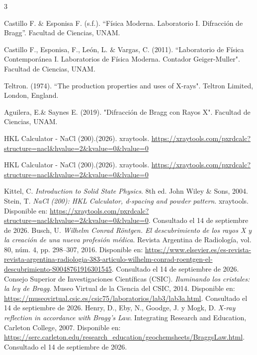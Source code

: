 \begin{thebibliography}{3}
	
	
	
	Castillo F. $\&$ Esponisa F. (s.f.). “Física Moderna. Laboratorio I. Difracción de Bragg”. Facultad de Ciencias, UNAM.
	
	Castillo F., Esponisa, F., León, L. $\&$ Vargas, C. (2011). “Laboratorio de Física Contemporánea I. Laboratorios de Física Moderna. Contador Geiger-Muller". Facultad de Ciencias, UNAM.
	
	Teltron. (1974). “The production properties and uses of X-rays". Teltron Limited, London, England.
	
	Aguilera, E.$\&$ Saynes E. (2019). "Difracción de Bragg con Rayos X". Facultad de Ciencias, UNAM.
	
	HKL Calculator - NaCl (200).(2026). xraytools. \url{https://xraytools.com/pxrdcalc?structure=nacl&hvalue=2&kvalue=0&lvalue=0}
	
	HKL Calculator - NaCl (200).(2026). xraytools. \url{https://xraytools.com/pxrdcalc?structure=nacl&hvalue=2&kvalue=0&lvalue=0}
	
	Kittel, C. \textit{Introduction to Solid State Physics}. 8th ed.
	John Wiley \& Sons, 2004.
	Stein, T. \textit{NaCl (200): HKL Calculator, d-spacing and powder pattern}.
	xraytools. Disponible en:
	\url{https://xraytools.com/pxrdcalc?structure=nacl\&hvalue=2\&kvalue=0\&lvalue=0}.
	Consultado el 14 de septiembre de 2026.
	Busch, U. \textit{Wilhelm Conrad Röntgen. El descubrimiento de los rayos X y
		la creación de una nueva profesión médica}. Revista Argentina de Radiología,
	vol. 80, núm. 4, pp. 298--307, 2016. Disponible en:
	\url{https://www.elsevier.es/es-revista-revista-argentina-radiologia-383-articulo-wilhelm-conrad-roentgen-el-descubrimiento-S0048761916301545}.
	Consultado el 14 de septiembre de 2026.
	Consejo Superior de Investigaciones Científicas (CSIC).
	\textit{Iluminando los cristales: la ley de Bragg}. Museo Virtual de la
	Ciencia del CSIC, 2014. Disponible en:
	\url{https://museovirtual.csic.es/csic75/laboratorios/lab3/lab3a.html}.
	Consultado el 14 de septiembre de 2026.
	Henry, D., Eby, N., Goodge, J. y Mogk, D.
	\textit{X-ray reflection in accordance with Bragg's Law}.
	Integrating Research and Education, Carleton College, 2007. Disponible en:
	\url{https://serc.carleton.edu/research_education/geochemsheets/BraggsLaw.html}.
	Consultado el 14 de septiembre de 2026.
	
\end{thebibliography}